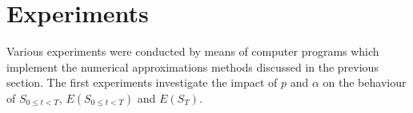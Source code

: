 \documentclass[a4paper,onecolumn]{IEEEtran}
\begin{document}
\section{Experiments}
Various experiments were conducted by means of computer programs which
implement the numerical approximations methods discussed in the previous
section. The first experiments investigate the impact of $p$ and $\alpha$ on
the behaviour of $S_{0 \leq t < T}$, $E(S_{0 \leq t < T})$ and $E(S_T)$.
\end{document}

